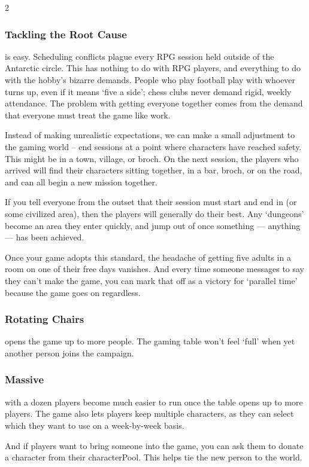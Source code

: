 \begin{multicols}{2}
\subsubsection{Tackling the Root Cause}
is easy.
Scheduling conflicts plague every RPG session held outside of the Antarctic circle.
This has nothing to do with RPG players, and everything to do with the hobby's bizarre demands.
People who play football play with whoever turns up, even if it means `five a side'; chess clubs never demand rigid, weekly attendance.
The problem with getting everyone together comes from the demand that everyone must treat the game like work.

Instead of making unrealistic expectations, we can make a small adjustment to the gaming world -- end sessions at a point where characters have reached safety.
This might be in a town, \gls{village}, or \gls{broch}.
On the next session, the players who arrived will find their characters sitting together, in a bar, \gls{broch}, or on the road, and can all begin a new mission together.

If you tell everyone from the outset that their session must start and end in  (or some civilized area), then the players will generally do their best.
Any `dungeons' become an area they enter quickly, and jump out of once something --- anything --- has been achieved.

Once your game adopts this standard, the headache of getting five adults in a room on one of their free days vanishes.
And every time someone messages to say they can't make the game, you can mark that off as a victory for `parallel time' because the game goes on regardless.

\subsubsection{Rotating Chairs}
opens the game up to more people.
The gaming table won't feel `full' when yet another person joins the \gls{campaign}.

\subsubsection{Massive }
with a dozen players become much easier to run once the table opens up to more players.
The game also lets players keep multiple characters, as they can select which they want to use on a week-by-week basis.

And if players want to bring someone into the game, you can ask them to donate a character from their \gls{characterPool}.
This helps tie the new person to the world.


\end{multicols}
